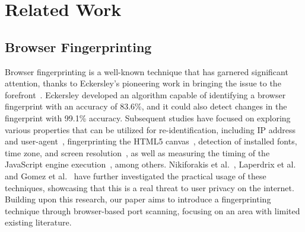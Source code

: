 \chapter{Related Work}





\section{Browser Fingerprinting}
\label{browser-fingerprinting}

Browser fingerprinting is a well-known technique that has garnered significant attention, thanks to Eckersley's pioneering work in bringing the issue to the forefront~. Eckersley developed an algorithm capable of identifying a browser fingerprint with an accuracy of 83.6\%, and it could also detect changes in the fingerprint with 99.1\% accuracy. Subsequent studies have focused on exploring various properties that can be utilized for re-identification, including IP address and user-agent~, fingerprinting the HTML5 canvas~, detection of installed fonts, time zone, and screen resolution~, as well as measuring the timing of the JavaScript engine execution~, among others.
Nikiforakis et al.~, Laperdrix et al.~ and Gomez et al.~ have further investigated the practical usage of these techniques, showcasing that this is a real threat to user privacy on the internet. Building upon this research, our paper aims to introduce a fingerprinting technique through browser-based port scanning, focusing on an area with limited existing literature.

